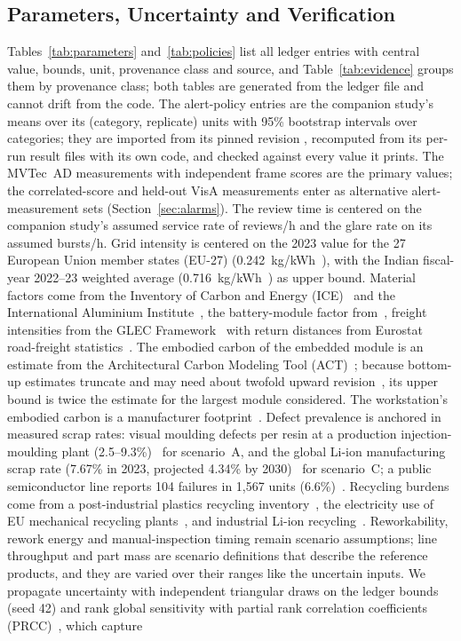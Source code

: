\subsection{Parameters, Uncertainty and Verification}
Tables~\ref{tab:parameters} and~\ref{tab:policies} list all \RegistryEntries{} ledger entries with central value, bounds, unit, provenance class and source, and Table~\ref{tab:evidence} groups them by provenance class; both tables are generated from the ledger file and cannot drift from the code. The alert-policy entries are the companion study's means over its (category, replicate) units with 95\% bootstrap intervals over categories; they are imported from its pinned revision \texttt{\PaperACommit}, recomputed from its per-run result files with its own code, and checked against every value it prints. The MVTec~AD measurements with independent frame scores are the primary values; the correlated-score and held-out VisA measurements enter as alternative alert-measurement sets (Section~\ref{sec:alarms}). The review time is centered on the companion study's assumed service rate of \PaperAMu{} reviews/h and the glare rate on its assumed \PaperAGlareRate{} bursts/h. Grid intensity is centered on the 2023 value for the 27 European Union member states (EU-27) (0.242~kg/kWh~\cite{ember2024}), with the Indian fiscal-year 2022--23 weighted average (0.716~kg/kWh~\cite{cea2023}) as upper bound. Material factors come from the Inventory of Carbon and Energy (ICE)~\cite{ice2011} and the International Aluminium Institute~\cite{iai2023}, the battery-module factor from~\cite{ivl2019}, freight intensities from the GLEC Framework~\cite{glec2023} with return distances from Eurostat road-freight statistics~\cite{eurostat2026road}. The embodied carbon of the embedded module is an estimate from the Architectural Carbon Modeling Tool (ACT)~\cite{halder2025carbon,gupta2022act}; because bottom-up estimates truncate and may need about twofold upward revision~\cite{pirson2021embodied}, its upper bound is twice the estimate for the largest module considered. The workstation's embodied carbon is a manufacturer footprint~\cite{dell2021optiplex}. Defect prevalence is anchored in measured scrap rates: visual moulding defects per resin at a production injection-moulding plant (2.5--9.3\%)~\cite{nguyen2004injection} for scenario~A, and the global Li-ion manufacturing scrap rate (7.67\% in 2023, projected 4.34\% by 2030)~\cite{yu2024scrap} for scenario~C; a public semiconductor line reports 104 failures in 1{,}567 units (6.6\%)~\cite{secom2008}. Recycling burdens come from a post-industrial plastics recycling inventory~\cite{ruggeri2025postindustrial}, the electricity use of EU mechanical recycling plants~\cite{jrc2023plastics}, and industrial Li-ion recycling~\cite{machala2025recycling}. Reworkability, rework energy and manual-inspection timing remain scenario assumptions; line throughput and part mass are scenario definitions that describe the reference products, and they are varied over their ranges like the uncertain inputs. We propagate uncertainty with \MonteCarloDraws{} independent triangular draws on the ledger bounds (seed 42) and rank global sensitivity with partial rank correlation coefficients (PRCC)~\cite{marino2008methodology}, which capture 